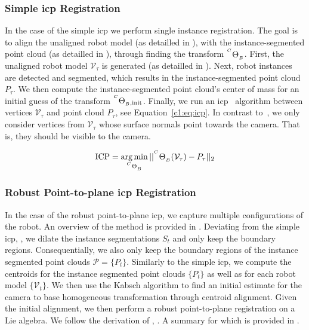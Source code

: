 \subsubsection{Simple \acrshort{icp} Registration}
\label{c1:sec:simple_icp_registration}
In the case of the simple \acrshort{icp} we perform single instance registration. The goal is to align the unaligned robot model (as detailled in ), with the instance-segmented point cloud (as detailled in ), through finding the transform ${}^{^C}\Theta_{_B}$. First, the unaligned robot model $\mathcal{V}_\tau$ is generated (as detailled in ). Next, robot instances are detected and segmented, which results in the instance-segmented point cloud $P_\tau$. We then compute the instance-segmented point cloud's center of mass for an initial guess of the transform ${}^{^{C}}\Theta_{_B,\text{init}}$. Finally, we run an \acrshort{icp}~\cite{simple_icp} algorithm between vertices $\mathcal{V}_\tau$ and point cloud $P_\tau$, see Equation~\ref{c1:eq:icp}. In contrast to~\cite{simple_icp}, we only consider vertices from $\mathcal{V}_\tau$ whose surface normals point towards the camera. That is, they should be visible to the camera.

\begin{equation}
    \label{c1:eq:icp}
    \text{ICP} = \argmin_{\homogeneous{C}{B}} || \homogeneous{C}{B}(\mathcal{V}_\tau) - P_\tau||_2
\end{equation}

\subsubsection{Robust Point-to-plane \acrshort{icp} Registration}
\label{c1:sec:robust_icp}

In the case of the robust point-to-plane \acrshort{icp}, we capture multiple configurations of the robot. An overview of the method is provided in . Deviating from the simple \acrshort{icp}, , we dilate the instance segmentations $S_t$ and only keep the boundary regions. Consequentially, we also only keep the boundary regions of the instance segmented point clouds $\mathcal{P} = \{P_t\}$. Similarly to the simple \acrshort{icp}, we compute the centroids for the instance segmented point clouds $\{P_t\}$ as well as for each robot model $\{\mathcal{V}_t\}$. We then use the Kabsch algorithm to find an initial estimate for the camera to base homogeneous transformation through centroid alignment. Given the initial alignment, we then perform a robust point-to-plane registration on a Lie algebra. We follow the derivation of , . A summary for which is provided in .


